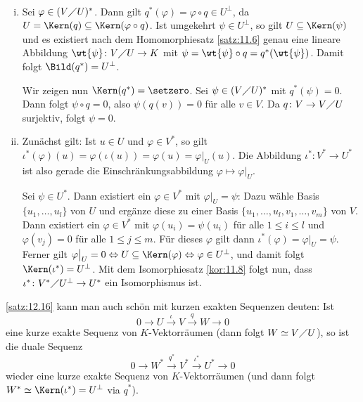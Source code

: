 \begin{beweis}
	\mbox{} \\[-.9cm]
	\begin{enumerate}[(i)]
		\item Sei $\varphi \in (V \diagup U)^*$.
		Dann gilt $q^*(\varphi) = \varphi \circ q \in U^\perp$, da $U = \Kern(q) \subseteq \Kern(\varphi \circ q)$.
		Ist umgekehrt $\psi \in U^\perp$, so gilt $U \subseteq \Kern(\psi)$ und es existiert nach dem Homomorphiesatz \ref{satz:11.6} genau eine lineare Abbildung $\wt{\psi} \colon V \diagup U \rightarrow K$ mit $\psi = \wt{\psi} \circ q = q^*(\wt{\psi})$.
		Damit folgt $\Bild(q^*) = U^\perp$.
		
		Wir zeigen nun $\Kern(q^*) = \setzero$.
		Sei $\psi \in (V \diagup U)^*$ mit $q^*(\psi) = 0$.
		Dann folgt $\psi \circ q = 0$, also $\psi(q(v))=0$ für alle $v \in V$.
		Da $q \colon V \rightarrow V \diagup U$ surjektiv, folgt $\psi = 0$.
		\item Zunächst gilt: Ist $u \in U$ und $\varphi \in V^*$, so gilt $\iota^*(\varphi)(u) = \varphi(\iota(u)) = \varphi(u) = \varphi \big|_{U}(u)$.
		Die Abbildung $\iota^* \colon V^* \rightarrow U^*$ ist also gerade die Einschränkungsabbildung $\varphi \mapsto \varphi \big|_U$.
		
		Sei $\psi \in U^*$.
		Dann existiert ein $\varphi \in V^*$ mit $\varphi \big|_U = \psi$:
		Dazu wähle Basis $\{u_1,\dots,u_l\}$ von $U$ und ergänze diese zu einer Basis $\{u_1,\dots,u_l,v_1,\dots,v_m\}$ von $V$.
		Dann existiert ein $\varphi \in V^*$ mit $\varphi(u_i) = \psi(u_i)$ für alle $1 \leq i \leq l$ und $\varphi(v_j) = 0$ für alle $1 \leq j \leq m$.
		Für dieses $\varphi$ gilt dann $\iota^*(\varphi) = \varphi \big|_U = \psi$.
		Ferner gilt $\varphi \big|_U = 0 \Leftrightarrow U \subseteq \Kern(\varphi) \Leftrightarrow \varphi \in U^\perp$, und damit folgt $\Kern(\iota^*) = U^\perp$.
		Mit dem Isomorphiesatz \ref{kor:11.8} folgt nun, dass $\iota^*\colon V^* \diagup U^\perp \rightarrow U^*$ ein Isomorphismus ist. \qedhere
	\end{enumerate}
\end{beweis}

\begin{bemerkung}
	\label{bem:12.17}
	\autoref{satz:12.16} kann man auch schön mit kurzen exakten Sequenzen deuten:
	Ist
	\[
		0 \rightarrow U \xrightarrow{\iota} V \xrightarrow{q} W \rightarrow 0
	\]
	eine kurze exakte Sequenz von $K$-Vektorräumen (dann folgt $W \simeq V \diagup U$), so ist die duale Sequenz
	\[
		0 \rightarrow W^* \xrightarrow{q^*} V^* \xrightarrow{\iota^*} U^* \rightarrow 0
	\]
	wieder eine kurze exakte Sequenz von $K$-Vektorräumen (und dann folgt $W^* \simeq \Kern(\iota^*) = U^\perp$ via $q^*$).
\end{bemerkung}


